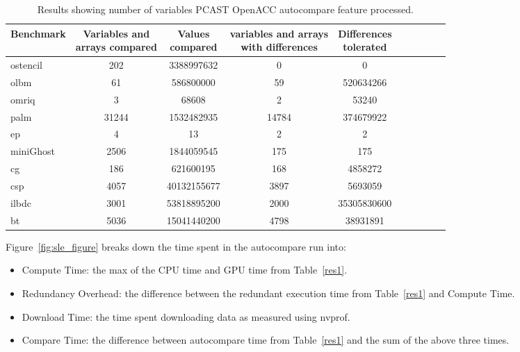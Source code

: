 \begin{table}
\begin{center}
\begin{tabular}{|l|c|c|c|c|c|c|c|c|c|}
\hline

Benchmark &  \parbox[c]{3 cm}{\centering Variables and \\ arrays compared} &  \parbox[c]{2 cm}{\centering Values \\ compared} &  \parbox[c]{3 cm}{\centering variables and arrays \\     with differences} & \parbox[c]{2 cm}{\centering Differences \\      tolerated}\\



\hline

ostencil  & 202 & 3388997632 & 0 & 0\\
olbm      & 61 & 586800000 & 59 & 520634266\\
omriq     & 3 & 68608 & 2 & 53240 \\
palm      & 31244 & 1532482935 & 14784 & 374679922\\
ep        & 4 & 13 & 2 & 2 \\
miniGhost & 2506 & 1844059545 & 175 & 175\\
cg        & 186 & 621600195 & 168 & 4858272\\
csp       & 4057 & 40132155677	& 3897 & 5693059\\
ilbdc     & 3001 & 53818895200 & 2000 & 35305830600 \\
bt        & 5036 & 15041440200 & 4798 & 38931891 \\

            
\hline
\end{tabular}
\end{center}
\caption{Results showing number of variables PCAST OpenACC autocompare feature processed.}
\label{res2}
\end{table}




Figure~\ref{fig:sle_figure} breaks down the time spent in the autocompare run into:
\begin{itemize}
\item Compute Time: the max of the CPU time and GPU time from Table~\ref{res1}.
\item Redundancy Overhead: the difference between the redundant execution time from Table~\ref{res1} and Compute Time.
\item Download Time: the time spent downloading data as measured using nvprof.
\item Compare Time: the difference between autocompare time from Table~\ref{res1} and the sum of the above three times.
\end{itemize}

